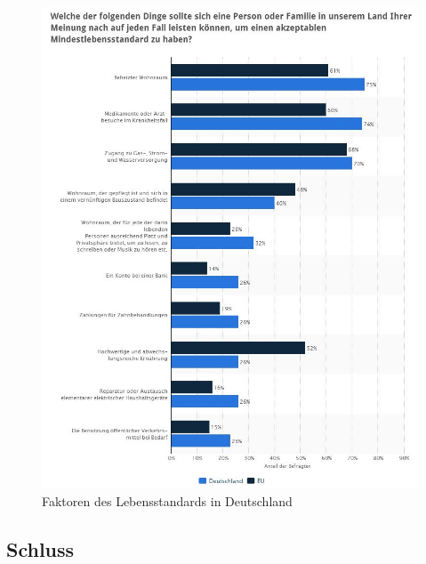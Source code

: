 \begin{figure} [hp]
\centering
\includegraphics[width=0.7\linewidth]{./images/FaktorenLebensstand}
\caption{Faktoren des Lebensstandards in Deutschland \cite{statistaDeLebnst}}
\label{fig:FaktorenLebensstand}
\end{figure}

\subsection{Schluss}

	
